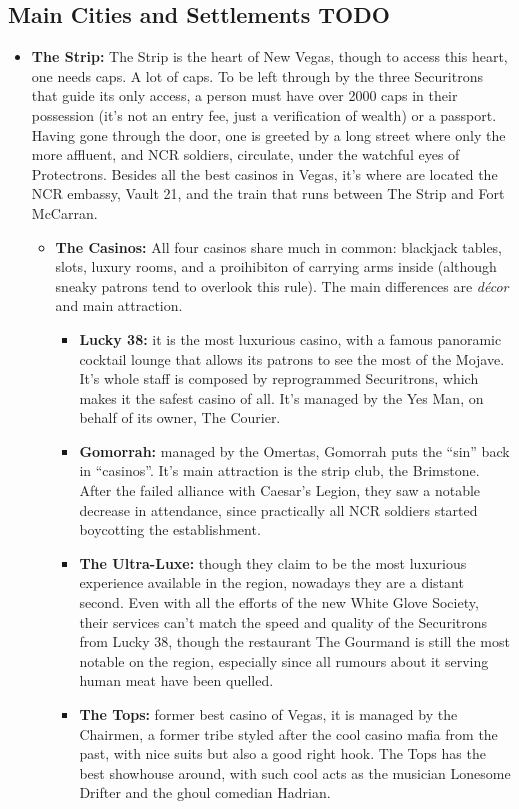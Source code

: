 \documentclass[11pt]{article} %
\begin{document}
\subsection{Main Cities and Settlements TODO}

\begin{itemize}
\item \textbf{The Strip:} The Strip is the heart of New Vegas, though to access this heart, one needs caps. A lot of caps. To be left through by the three Securitrons that guide its only access, a person must have over 2000 caps in their possession (it's not an entry fee, just a verification of wealth) or a passport. Having gone through the door, one is greeted by a long street where only the more affluent, and NCR soldiers, circulate, under the watchful eyes of Protectrons. Besides all the best casinos in Vegas, it's where are located the NCR embassy, Vault 21, and the train that runs between The Strip and Fort McCarran. 
\begin{itemize}
\item \textbf{The Casinos:} All four casinos share much in common: blackjack tables, slots, luxury rooms, and a proihibiton of carrying arms inside (although sneaky patrons tend to overlook this rule). The main differences are \textit{décor} and main attraction. 
\begin{itemize}
\item \textbf{Lucky 38:} it is the most luxurious casino, with a famous panoramic cocktail lounge that allows its patrons to see the most of the Mojave. It's whole staff is composed by reprogrammed Securitrons, which makes it the safest casino of all. It's managed by the Yes Man, on behalf of its owner, The Courier.
\item \textbf{Gomorrah:} managed by the Omertas, Gomorrah puts the ``sin'' back in ``casinos''. It's main attraction is the strip club, the Brimstone. After the failed alliance with Caesar's Legion, they saw a notable decrease in attendance, since practically all NCR soldiers started boycotting the establishment.
\item \textbf{The Ultra-Luxe:} though they claim to be the most luxurious experience available in the region, nowadays they are a distant second. Even with all the efforts of the new White Glove Society, their services can't match the speed and quality of the Securitrons from Lucky 38, though the restaurant The Gourmand is still the most notable on the region, especially since all rumours about it serving human meat have been quelled.
\item \textbf{The Tops:} former best casino of Vegas, it is managed by the Chairmen, a former tribe styled after the cool casino mafia from the past, with nice suits but also a good right hook. The Tops has the best showhouse around, with such cool acts as the musician Lonesome Drifter and the ghoul comedian Hadrian.
\end{itemize}
\end{itemize}


\end{itemize}
\end{document}
